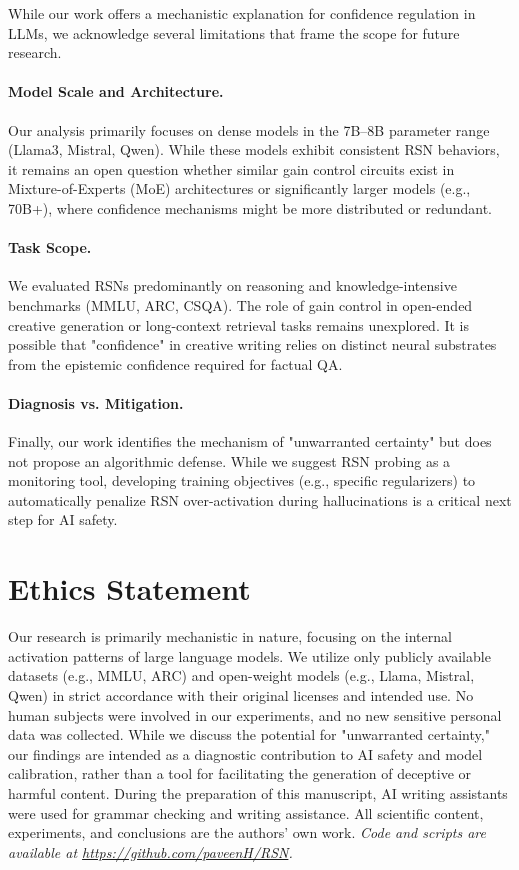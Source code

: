 \documentclass{article}
\begin{document}
While our work offers a mechanistic explanation for confidence regulation in LLMs, we acknowledge several limitations that frame the scope for future research.

\paragraph{Model Scale and Architecture.} Our analysis primarily focuses on dense models in the 7B--8B parameter range (Llama3, Mistral, Qwen). While these models exhibit consistent RSN behaviors, it remains an open question whether similar gain control circuits exist in Mixture-of-Experts (MoE) architectures or significantly larger models (e.g., 70B+), where confidence mechanisms might be more distributed or redundant.

\paragraph{Task Scope.} We evaluated RSNs predominantly on reasoning and knowledge-intensive benchmarks (MMLU, ARC, CSQA). The role of gain control in open-ended creative generation or long-context retrieval tasks remains unexplored. It is possible that "confidence" in creative writing relies on distinct neural substrates from the epistemic confidence required for factual QA.

\paragraph{Diagnosis vs. Mitigation.} Finally, our work identifies the mechanism of "unwarranted certainty" but does not propose an algorithmic defense. While we suggest RSN probing as a monitoring tool, developing training objectives (e.g., specific regularizers) to automatically penalize RSN over-activation during hallucinations is a critical next step for AI safety.

\section*{Ethics Statement}
Our research is primarily mechanistic in nature, focusing on the internal activation patterns of large language models. We utilize only publicly available datasets (e.g., MMLU, ARC) and open-weight models (e.g., Llama, Mistral, Qwen) in strict accordance with their original licenses and intended use. No human subjects were involved in our experiments, and no new sensitive personal data was collected. While we discuss the potential for "unwarranted certainty," our findings are intended as a diagnostic contribution to AI safety and model calibration, rather than a tool for facilitating the generation of deceptive or harmful content. During the preparation of this manuscript, AI writing assistants were used for grammar checking and writing assistance. All scientific content, experiments, and conclusions are the authors' own work. \emph{Code and scripts are available at \url{https://github.com/paveenH/RSN}.}
\end{document}
